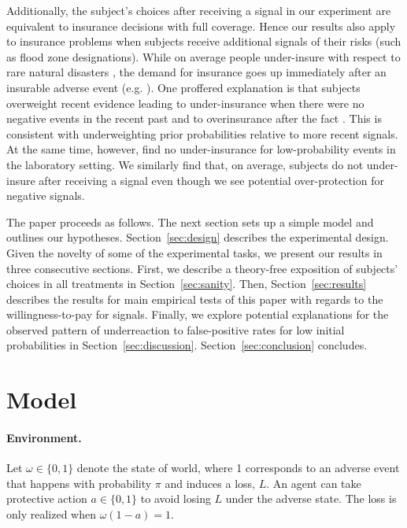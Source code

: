 \documentclass[12pt,a4paper]{article}
\begin{document}
Additionally, the subject's choices after receiving a signal in our experiment are equivalent to insurance decisions with full coverage. Hence our results also apply to insurance problems when subjects receive additional signals of their risks (such as flood zone designations). While on average people under-insure with respect to rare natural disasters \citep{friedl_insurance_2014}, the demand for insurance goes up immediately after an insurable adverse event (e.g. \citep{kousky_understanding_2011}). One proffered explanation is that subjects overweight recent evidence leading to under-insurance when there were no negative events in the recent past and to overinsurance after the fact \citep{volkman-wise_representativeness_2015}. This is consistent with underweighting prior probabilities relative to more recent signals. At the same time, however, \citet{laury_insurance_2009} find no under-insurance for low-probability events in the laboratory setting.  We similarly find that, on average, subjects do not under-insure after receiving a signal even though we see potential over-protection for negative signals.

The paper proceeds as follows. The next section sets up a simple model and outlines our hypotheses. Section~\ref{sec:design} describes the experimental design. Given the novelty of some of the experimental tasks, we present our results in three consecutive sections. First, we describe a theory-free exposition of subjects' choices in all treatments in Section~\ref{sec:sanity}. Then, Section~\ref{sec:results} describes the results for main empirical tests of this paper with regards to the willingness-to-pay for signals. Finally, we explore potential explanations for the observed pattern of underreaction to false-positive rates for low initial probabilities in Section~\ref{sec:discussion}. Section~\ref{sec:conclusion} concludes. 


\vspace{20pt}
\section{Model}\label{sec:model}
\paragraph{Environment.} Let $\omega \in \{0,1\}$ denote the state of world, where 1 corresponds to an adverse event that happens with probability $\pi$ and induces a loss, $L$. An agent can take protective action $a\in\{0,1\}$ to avoid losing $L$ under the adverse state. The loss is only realized when $\omega(1-a)=1$.
\end{document}
